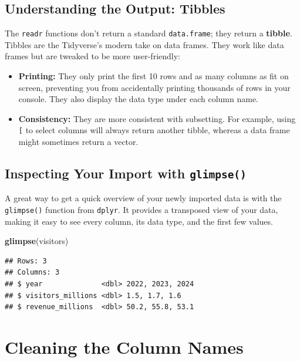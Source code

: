 \documentclass[
  11pt,
]{article}
\newenvironment{Shaded}{\begin{snugshade}}{\end{snugshade}}
\newcommand{\FunctionTok}[1]{\textcolor[rgb]{0.13,0.29,0.53}{\textbf{#1}}}
\newcommand{\NormalTok}[1]{#1}
\providecommand{\tightlist}{%
  \setlength{\itemsep}{0pt}\setlength{\parskip}{0pt}}
\begin{document}
\subsection{Understanding the Output:
Tibbles}\label{understanding-the-output-tibbles}

The \texttt{readr} functions don't return a standard
\texttt{data.frame}; they return a \textbf{tibble}. Tibbles are the
Tidyverse's modern take on data frames. They work like data frames but
are tweaked to be more user-friendly:

\begin{itemize}
\tightlist
\item
  \textbf{Printing:} They only print the first 10 rows and as many
  columns as fit on screen, preventing you from accidentally printing
  thousands of rows in your console. They also display the data type
  under each column name.
\item
  \textbf{Consistency:} They are more consistent with subsetting. For
  example, using \texttt{{[}} to select columns will always return
  another tibble, whereas a data frame might sometimes return a vector.
\end{itemize}

\subsection{\texorpdfstring{Inspecting Your Import with
\texttt{glimpse()}}{Inspecting Your Import with glimpse()}}\label{inspecting-your-import-with-glimpse}

A great way to get a quick overview of your newly imported data is with
the \texttt{glimpse()} function from \texttt{dplyr}. It provides a
transposed view of your data, making it easy to see every column, its
data type, and the first few values.

\begin{Shaded}
\begin{Highlighting}[]
\FunctionTok{glimpse}\NormalTok{(visitors)}
\end{Highlighting}
\end{Shaded}

\begin{verbatim}
## Rows: 3
## Columns: 3
## $ year              <dbl> 2022, 2023, 2024
## $ visitors_millions <dbl> 1.5, 1.7, 1.6
## $ revenue_millions  <dbl> 50.2, 55.8, 53.1
\end{verbatim}

\section{Cleaning the Column Names}\label{cleaning-the-column-names}
\end{document}
